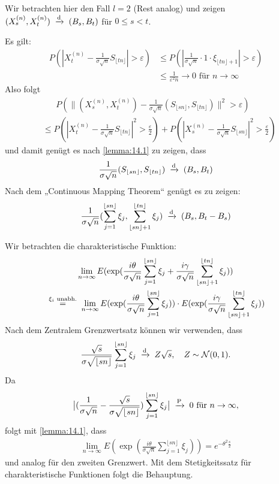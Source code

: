 \documentclass[a4paper,twoside,DIV15,BCOR12mm]{scrbook}
\begin{document}
\begin{beweis}
Wir betrachten hier den Fall $l=2$ (Rest analog) und zeigen $(X_s^{(n)}, X_t^{(n)}) \tonach d (B_s,B_t)$ für $0\le s < t$.

Es gilt:
\begin{align*}
P(|X_t^{(n)} - \frac 1 {\sigma \sqrt n} S_{\lfloor tn\rfloor}| > \varepsilon) &\le P(|\frac 1{\sigma\sqrt n} \cdot 1 \cdot  \xi_{\lfloor tn\rfloor +1}|>\varepsilon) \\
&\le \frac{1}{\varepsilon^2n} \to 0\text{ für }n\to\infty
\end{align*}
Also folgt
\begin{align*}
&\phantom{=.}P(\| (X_s^{(n)},X_t^{(n)}) - \frac 1 {\sigma \sqrt n}(S_{\lfloor sn\rfloor}, S_{\lfloor tn\rfloor})\|^2 >\varepsilon) \\
&\le P(|X_t^{(n)} - \frac1{\sigma \sqrt n} S_{\lfloor tn\rfloor}|^2 > \frac \varepsilon 2) +
P(|X_s^{(n)} - \frac1{\sigma \sqrt n} S_{\lfloor sn\rfloor}|^2 > \frac \varepsilon 2)
\end{align*}
und damit genügt es nach \ref{lemma:14.1} zu zeigen, dass 
\begin{align*}
\frac1{\sigma\sqrt n} (S_{\lfloor sn\rfloor}, S_{\lfloor tn\rfloor }) \tonach d (B_s,B_t)
\end{align*}
Nach dem „Continuous Mapping Theorem“ genügt es zu zeigen:
\begin{align*}
\frac1{\sigma\sqrt n} (\sum_{j=1}^{\lfloor sn\rfloor}\xi_j, \sum_{\lfloor sn\rfloor+1}^{\lfloor tn\rfloor}\xi_j) \tonach d (B_s,B_t-B_s)
\end{align*}

Wir betrachten die charakteristische Funktion:
\begin{multline*}
\lim_{n\to\infty} E(\exp(\frac{i\theta}{\sigma\sqrt n} \sum_{j=1}^{\lfloor sn\rfloor}\xi_j  + \frac{i\gamma}{\sigma\sqrt n} \sum_{\lfloor sn\rfloor+1}^{\lfloor tn\rfloor}\xi_j)) \\
\gleichnach{$\xi_i$ unabh.}
\lim_{n\to\infty} E(\exp(\frac{i\theta}{\sigma\sqrt n} \sum_{j=1}^{\lfloor sn\rfloor}\xi_j))  \cdot E(\exp(\frac{i\gamma}{\sigma\sqrt n} \sum_{\lfloor sn\rfloor+1}^{\lfloor tn\rfloor}\xi_j))
\end{multline*}
Nach dem Zentralem Grenzwertsatz können wir verwenden, dass
\begin{align*}
\frac{\sqrt s}{\sigma \sqrt{\lfloor sn\rfloor}} \sum_{j=1}^{\lfloor sn\rfloor} \xi _j \tonach d Z\sqrt s, \quad Z\sim \mathcal N(0,1).
\end{align*}
Da 
\begin{align*}
\big|(\frac{1}{\sigma \sqrt n} - \frac{\sqrt s}{\sigma\sqrt{\lfloor sn\rfloor}}) \sum_{j=1}^{\lfloor sn\rfloor}\xi_j\big| \tonach P 0 \text{ für } n\to \infty,
\end{align*}
folgt mit \ref{lemma:14.1}, dass
\begin{align*}
\lim_{n\to\infty} E(\exp(\frac{i\theta}{\sigma\sqrt n} \sum_{j=1}^{\lfloor sn\rfloor}\xi_j)) = e^{-\theta^2 \frac s2}
\end{align*}
und analog für den zweiten Grenzwert. Mit dem Stetigkeitssatz für charakteristische Funktionen folgt die Behauptung.
\end{beweis}
\end{document}
